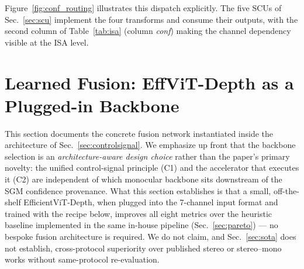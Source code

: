 \documentclass[journal]{IEEEtran}
\begin{document}
Figure~\ref{fig:conf_routing} illustrates this dispatch explicitly. The five SCUs of Sec.~\ref{sec:scu} implement the four transforms and consume their outputs, with the second column of Table~\ref{tab:isa} (column \emph{conf}) making the channel dependency visible at the ISA level.

\section{Learned Fusion: EffViT-Depth as a Plugged-in Backbone}
\label{sec:effvit}

This section documents the concrete fusion network instantiated inside the architecture of Sec.~\ref{sec:controlsignal}. We emphasize up front that the backbone selection is an \emph{architecture-aware design choice} rather than the paper's primary novelty: the unified control-signal principle (C1) and the accelerator that executes it (C2) are independent of which monocular backbone sits downstream of the SGM confidence provenance. What this section establishes is that a small, off-the-shelf EfficientViT-Depth, when plugged into the 7-channel input format and trained with the recipe below, improves all eight metrics over the heuristic baseline implemented in the same in-house pipeline (Sec.~\ref{sec:pareto}) --- no bespoke fusion architecture is required. We do not claim, and Sec.~\ref{sec:sota} does not establish, cross-protocol superiority over published stereo or stereo--mono works without same-protocol re-evaluation.
\end{document}
